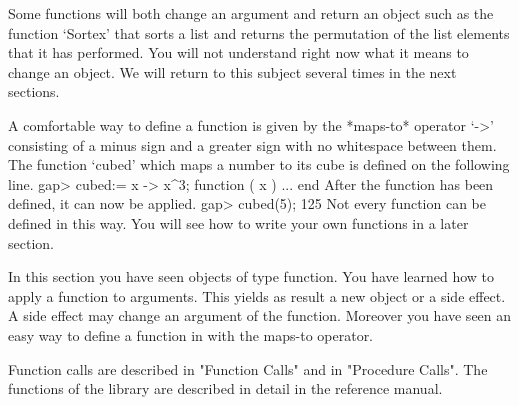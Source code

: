 Some functions will both change an argument  and return an object such as
the function `Sortex'  that sorts a  list and returns the permutation  of
the list  elements that it has  performed.  You will not understand right
now what it means  to change an object.   We will return to this  subject
several times in the next sections.

A comfortable way to define a function is given by the *maps-to* operator
%
`->' consisting of  a minus sign and a   greater sign with  no whitespace
between them. The function  `cubed' which maps a  number  to its  cube is
defined on the following line.
\beginexample
    gap> cubed:= x -> x^3;
    function ( x ) ... end 
\endexample
After the function has been defined, it can now be applied.
\beginexample
    gap> cubed(5);
    125 
\endexample
Not every {\GAP} function can be defined in this  way.   You will see how
to write your own {\GAP} functions in a later section.

In this section you have seen {\GAP} objects of  type function.  You have
learned how to apply a function to  arguments.  This  yields as result  a
new object or a side effect.  A side effect may change an argument of the
function.   Moreover you have seen an easy  way  to define a  function in
{\GAP} with the maps-to operator.

Function  calls are described   in   "Function Calls" and in   "Procedure
Calls".  The functions of the {\GAP}  library are  described in detail in
the reference manual.

